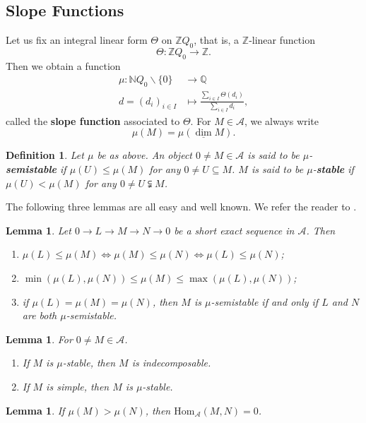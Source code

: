 \documentclass[a4paper,12pt]{amsart}
\newtheorem{definition}[theorem]{Definition}
\newtheorem{lemma}[theorem]{Lemma}
\newcommand{\Hom}{\mathrm{Hom}}
\newcommand{\udv}{\underline{\dim}}
\begin{document}
\subsection{Slope Functions}
Let us fix an integral linear form $\Theta$ on $\mathbb{Z}Q_0$, that is, a $\mathbb{Z}$-linear function
\[\Theta:\mathbb{Z}Q_0\rightarrow\mathbb{Z}.\]
Then we obtain a function
\begin{align*}
    \mu:\mathbb{N}Q_0\backslash\{0\}&\rightarrow\mathbb{Q}\\
    d=(d_i)_{i\in I}&\mapsto{\frac{\sum_{i\in I}\Theta(d_i)}{\sum_{i\in I}d_i}},
\end{align*}
called the \textbf{slope function} associated to $\Theta$. For $M\in\mathcal{A}$, we always write
\[\mu(M)=\mu(\udv M).\]
\begin{definition}
    Let $\mu$ be as above. An object $0\neq M\in\mathcal{A}$ is said to be $\mu$-\textbf{semistable} if $\mu(U)\leqslant\mu(M)$ for any $0\neq U\subseteq M$. $M$ is said to be $\mu$-\textbf{stable} if $\mu(U)<\mu(M)$ for any $0\neq U\subsetneqq M$.
\end{definition}
The following three lemmas are all easy and well known. We refer the reader to \cite{Rei2002}.
\begin{lemma}
    Let $0\rightarrow L\rightarrow M\rightarrow N\rightarrow 0$ be a short exact sequence in $\mathcal{A}$. Then
    \begin{enumerate}
        \item $\mu(L)\leqslant\mu(M)\iff\mu(M)\leqslant\mu(N)\iff\mu(L)\leqslant\mu(N)$;
        \item $\min(\mu(L),\mu(N))\leqslant\mu(M)\leqslant\max(\mu(L),\mu(N))$;
        \item if $\mu(L)=\mu(M)=\mu(N)$, then $M$ is $\mu$-semistable if and only if $L$ and $N$ are both $\mu$-semistable.
    \end{enumerate}
\end{lemma}
\begin{lemma}
For $0\neq M\in\mathcal{A}$.
\begin{enumerate}
    \item If $M$ is $\mu$-stable, then $M$ is indecomposable.
    \item If $M$ is simple, then $M$ is $\mu$-stable.
\end{enumerate}
\end{lemma}
\begin{lemma}
    If $\mu(M)>\mu(N)$, then $\Hom_\mathcal{A}(M,N)=0$.
\end{lemma}
\end{document}
